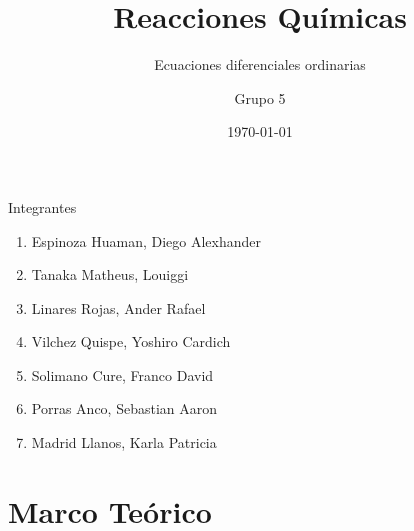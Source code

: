 \documentclass[
  10pt,
  ignorenonframetext,
  aspectratio=169,
]{beamer}
\title{Reacciones Químicas}
\subtitle{Ecuaciones diferenciales ordinarias}
\author{Grupo 5}
\date{\today{}}
\institute{Universidad Nacional Mayor de San Marcos}
\providecommand{\tightlist}{%
  \setlength{\itemsep}{0pt}\setlength{\parskip}{0pt}}
\begin{document}
\frame{\titlepage}

\begin{frame}[allowframebreaks]
  \tableofcontents[hideallsubsections]
\end{frame}
\begin{frame}{Integrantes}
\label{integrantes}
\begin{enumerate}
\tightlist
\item
  Espinoza Huaman, Diego Alexhander
\item
  Tanaka Matheus, Louiggi
\item
  Linares Rojas, Ander Rafael
\item
  Vilchez Quispe, Yoshiro Cardich
\item
  Solimano Cure, Franco David
\item
  Porras Anco, Sebastian Aaron
\item
  Madrid Llanos, Karla Patricia
\end{enumerate}
\end{frame}

\section{Marco Teórico}\label{marco-teuxf3rico}
\end{document}
